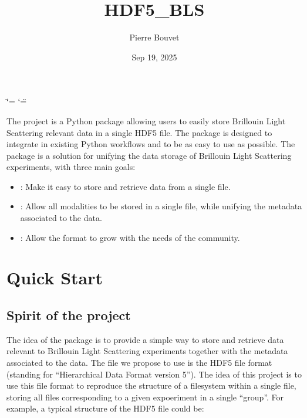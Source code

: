 \documentclass[letterpaper,10pt,english]{sphinxmanual}
\title{HDF5\_BLS}
\date{Sep 19, 2025}
\author{Pierre Bouvet}
\begin{document}
\ifdefined\shorthandoff
  \ifnum\catcode`\=\string=\active\shorthandoff{=}\fi
  \ifnum\catcode`\"=\active{}\fi
\fi

\pagestyle{empty}
\sphinxmaketitle
\pagestyle{plain}
\sphinxtableofcontents
\pagestyle{normal}
\label{\detokenize{index::doc}}


\sphinxAtStartPar
The  project is a Python package allowing users to easily store Brillouin Light Scattering relevant data in a single HDF5 file. The package is designed to integrate in existing Python workflows and to be as easy to use as possible. The package is a solution for unifying the data storage of Brillouin Light Scattering experiments, with three main goals:
\begin{itemize}
\item {} 
\sphinxAtStartPar
{}: Make it easy to store and retrieve data from a single file.

\item {} 
\sphinxAtStartPar
{}: Allow all modalities to be stored in a single file, while unifying the metadata associated to the data.

\item {} 
\sphinxAtStartPar
{}: Allow the format to grow with the needs of the community.

\end{itemize}


\chapter{Quick Start}
\label{\detokenize{index:quick-start}}

\section{Spirit of the project}
\label{\detokenize{index:spirit-of-the-project}}
\sphinxAtStartPar
The idea of the package is to provide a simple way to store and retrieve data relevant to Brillouin Light Scattering experiments together with the metadata associated to the data. The file we propose to use is the HDF5 file format (standing for “Hierarchical Data Format version 5”). The idea of this project is to use this file format to reproduce the structure of a filesystem within a single file, storing all files corresponding to a given expoeriment in a single “group”. For example, a typical structure of the HDF5 file could be:
\end{document}
